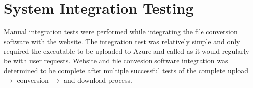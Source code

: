 
\section{System Integration Testing}
Manual integration tests were performed while integrating the file conversion software with the website. The integration test was relatively simple and only required the executable to be uploaded to Azure and called as it would regularly be with user requests. Website and file convesion software integration was determined to be complete after multiple successful tests of the complete upload $\rightarrow$ conversion $\rightarrow$ and download process.